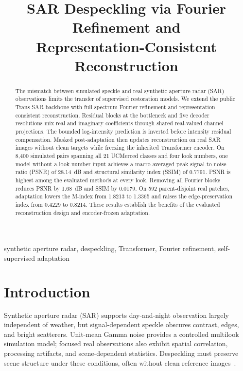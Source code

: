 \documentclass[conference]{IEEEtran}
\begin{document}
\title{SAR Despeckling via Fourier Refinement and\\
Representation-Consistent Reconstruction}

\author{}

\maketitle

\begin{abstract}
The mismatch between simulated speckle and real synthetic aperture radar (SAR) observations limits the transfer of supervised restoration models. We extend the public Trans-SAR backbone with full-spectrum Fourier refinement and representation-consistent reconstruction. Residual blocks at the bottleneck and five decoder resolutions mix real and imaginary coefficients through shared real-valued channel projections. The bounded log-intensity prediction is inverted before intensity residual compensation. Masked post-adaptation then updates reconstruction on real SAR images without clean targets while freezing the inherited Transformer encoder. On 8,400 simulated pairs spanning all 21 UCMerced classes and four look numbers, one model without a look-number input achieves a macro-averaged peak signal-to-noise ratio (PSNR) of 28.14~dB and structural similarity index (SSIM) of 0.7791. PSNR is highest among the evaluated methods at every look. Removing all Fourier blocks reduces PSNR by 1.68~dB and SSIM by 0.0179. On 592 parent-disjoint real patches, adaptation lowers the M-index from 1.8213 to 1.3365 and raises the edge-preservation index from 0.4229 to 0.8214. These results establish the benefits of the evaluated reconstruction design and encoder-frozen adaptation.
\end{abstract}

\begin{IEEEkeywords}
synthetic aperture radar, despeckling, Transformer, Fourier refinement, self-supervised adaptation
\end{IEEEkeywords}

\section{Introduction}
Synthetic aperture radar (SAR) supports day-and-night observation largely independent of weather, but signal-dependent speckle obscures contrast, edges, and bright scatterers. Unit-mean Gamma noise provides a controlled multilook simulation model; focused real observations also exhibit spatial correlation, processing artifacts, and scene-dependent statistics. Despeckling must preserve scene structure under these conditions, often without clean reference images~\cite{fracastoro2021overview}.
\end{document}
